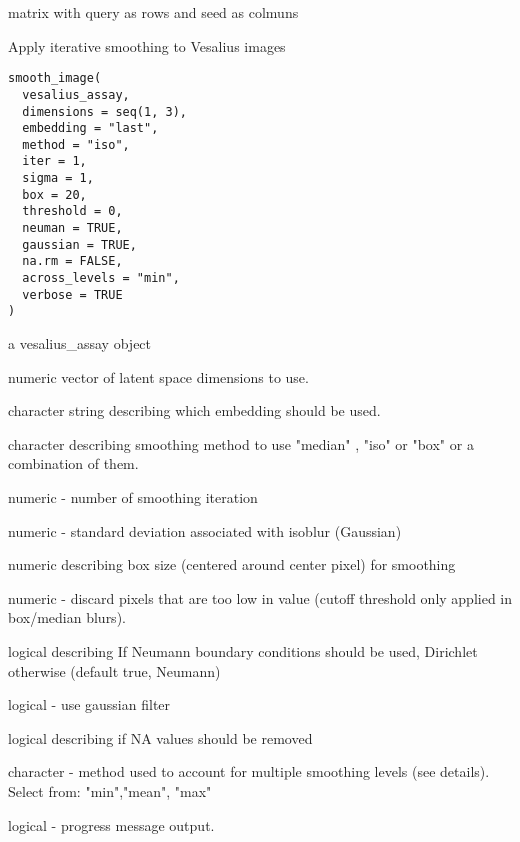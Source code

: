 \documentclass[a4paper]{book}
\begin{document}
%
\begin{Value}
matrix with query as rows and seed as colmuns
\end{Value}
%
\begin{Description}
Apply iterative smoothing to Vesalius images
\end{Description}
%
\begin{Usage}
\begin{verbatim}
smooth_image(
  vesalius_assay,
  dimensions = seq(1, 3),
  embedding = "last",
  method = "iso",
  iter = 1,
  sigma = 1,
  box = 20,
  threshold = 0,
  neuman = TRUE,
  gaussian = TRUE,
  na.rm = FALSE,
  across_levels = "min",
  verbose = TRUE
)
\end{verbatim}
\end{Usage}
%
\begin{Arguments}
\begin{ldescription}
\item[\code{vesalius\_assay}] a vesalius\_assay object

\item[\code{dimensions}] numeric vector of latent space dimensions to use.

\item[\code{embedding}] character string describing which embedding should
be used.

\item[\code{method}] character describing smoothing method to use "median" ,
"iso"  or "box" or a combination of them.

\item[\code{iter}] numeric - number of smoothing iteration

\item[\code{sigma}] numeric - standard deviation associated with isoblur (Gaussian)

\item[\code{box}] numeric describing box size (centered around center pixel)
for smoothing

\item[\code{threshold}] numeric - discard pixels that are too low in value (cutoff
threshold only applied in box/median blurs).

\item[\code{neuman}] logical describing If Neumann boundary conditions should be
used, Dirichlet otherwise (default true, Neumann)

\item[\code{gaussian}] logical - use gaussian filter

\item[\code{na.rm}] logical describing if NA values should be removed

\item[\code{across\_levels}] character - method used to account for multiple
smoothing levels (see details). Select from: "min","mean", "max"

\item[\code{verbose}] logical - progress message output.
\end{ldescription}
\end{Arguments}
\end{document}
